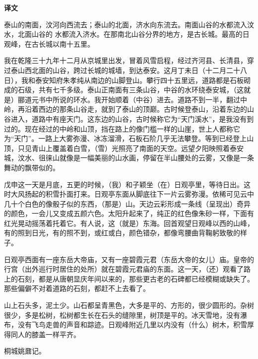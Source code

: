 \documentclass[12pt,UTF-8,openany,a4]{ctexbook}
\begin{document}
\newpage

\begin{Large}
    \noindent\textbf{译文}
\end{Large}


\vspace{1em}

\begin{large}
    \yiwen 
    泰山的南面，汶河向西流去；泰山的北面，济水向东流去。南面山谷的水都流入汶水，北面山谷的 水都流入济水。在那南北山谷分界的地方，是古长城。最高的日观峰，在古长城以南十五里。
    
    我在乾隆三十九年十二月从京城里出发，冒着风雪启程，经过齐河县、长清县，穿过泰山西北面的山谷，跨过长城的城墙，到达泰安。这月丁未日（十二月二十八日），我和泰安知府朱孝纯从南边的山脚登山。攀行四十五里远，道路都是石板砌成的石级，共有七千多级。泰山正南面有三条山谷，中谷的水环绕泰安城，（这就是）郦道元书中所说的环水。我开始顺着（中谷）进去。道路不到一半，翻过中岭，再沿着西边的那条山谷走，就到了泰山的顶巅。古时候登泰山，沿着东边的山谷进入，道路中有座天门。这东边的山谷，古时候称它为“天门溪水”，是我没有到过的。现在经过的中岭和山顶，挡在路上的像门槛一样的山崖，世上人都称它为“天门”。一路上大雾弥漫、冰冻溜滑，石板石阶几乎无法攀登。等到已经登上山顶，只见青山上覆盖着白雪，（雪）光照亮了南面的天空。远望夕阳映照着泰安城，汶水、徂徕山就像是一幅美丽的山水画，停留在半山腰处的云雾，又像是一条舞动的飘带似的。
    
    戊申这一天是月底，五更的时候，（我）和子颖坐（在）日观亭里，等待日出。这时大风扬起的积雪扑面打来。日观亭东面从脚底往下一片云雾弥漫。依稀可见云中几十个白色的像骰子似的东西，（那是）山。天边云彩形成一条线（呈现出）奇异的颜色，一会儿又变成五颜六色。太阳升起来了，纯正的红色像朱砂一样，下面有红光晃动摇荡着托着它。有人说，这（就是）东海。回首观望日观峰以西的山峰，有的照到日光，有的照不到，或红或白，颜色错杂，都像弯腰曲背鞠躬致敬的样子。
    
    日观亭西面有一座东岳大帝庙，又有一座碧霞元君（东岳大帝的女儿）庙。皇帝的行宫（出外巡行时居住的处所）就在碧霞元君庙的东面。这一天，（还）观看了路上的石刻，都是从唐朝显庆年间以来的，那些更古老的石碑都已经模糊或缺失了。那些偏僻不对着道路的石刻，都赶不上去看了。
    
    山上石头多，泥土少。山石都呈青黑色，大多是平的、方形的，很少圆形的。杂树很少，多是松树，松树都生长在石头的缝隙里，树顶是平的。冰天雪地，没有瀑布，没有飞鸟走兽的声音和踪迹。日观峰附近几里以内没有（什么）树木，积雪厚得同人的膝盖一样平齐。
    
    桐城姚鼐记。
    
\end{large}
\end{document}

